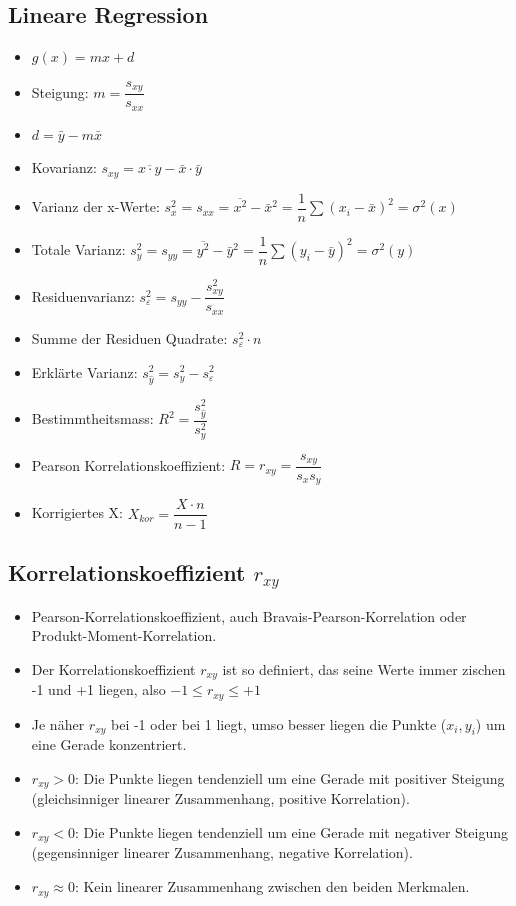 \documentclass[8pt,a4paper]{scrartcl}
\begin{document}
\begin{multicols*}{3}
		\section{Lineare Regression}
			\begin{itemize}\itemsep0pt				
				\item $g(x) = mx + d$
				\item Steigung: $m = \dfrac{s_{xy}}{s_{xx}}$
				\item $d = \bar{y} - m\bar{x}$
				\item Kovarianz: $s_{xy} = \overline{x \cdot y} - \bar{x} \cdot \bar{y}$
				\item Varianz der x-Werte: $s_{x}^{2}=s_{xx} = \overline{x^{2}} - \bar{x}^{2} = \dfrac{1}{n}\sum(x_{i}-\bar{x})^{2}  = \sigma^{2}(x)$
				\item Totale Varianz: $s_{y}^{2}=s_{yy} = \overline{y^{2}} - \bar{y}^{2}=  \dfrac{1}{n}\sum(y_{i}-\bar{y})^{2} = \sigma^{2}(y)$
				\item Residuenvarianz: $s_{\varepsilon}^{2} = s_{yy}-\dfrac{s_{xy}^{2}}{s_{xx}}$
				\item Summe der Residuen Quadrate: $s_{\varepsilon}^{2}\cdot n$
				\item Erklärte Varianz: $s_{\hat{y}}^{2}=s_{y}^{2}-s_{\varepsilon}^{2} $
				\item Bestimmtheitsmass: $R^{2}=\dfrac{s_{\hat{y}}^{2}}{s_{y}^{2}}$
				\item Pearson Korrelationskoeffizient: $R=r_{xy}=\dfrac{s_{xy}}{s_{x}s_{y}}$
				\item Korrigiertes X: $X_{kor} = \dfrac{X\cdot n}{n-1}$
			\end{itemize}
				
			\subsection{Korrelationskoeffizient $r_{xy}$}		
				\begin{itemize}\itemsep0pt				
					\item Pearson-Korrelationskoeffizient, auch Bravais-Pearson-Korrelation oder Produkt-Moment-Korrelation.
					\item Der Korrelationskoeffizient $r_{xy}$ ist so definiert, das seine Werte immer zischen -1 und +1 liegen, also $-1 \leq r_{xy} \leq +1$
					\item Je näher $r_{xy}$ bei -1 oder bei 1 liegt, umso besser liegen die Punkte ($x_{i}, y_{i}$) um eine Gerade konzentriert.
					\item $r_{xy} > 0$: Die Punkte liegen tendenziell um eine Gerade mit positiver Steigung (gleichsinniger linearer Zusammenhang, positive Korrelation).
					\item $r_{xy} < 0$: Die Punkte liegen tendenziell um eine Gerade mit negativer Steigung (gegensinniger linearer Zusammenhang, negative Korrelation).
					\item $r_{xy} \approx 0$: Kein linearer Zusammenhang zwischen den beiden Merkmalen.
				\end{itemize}				
				

\end{multicols*}
\end{document}
